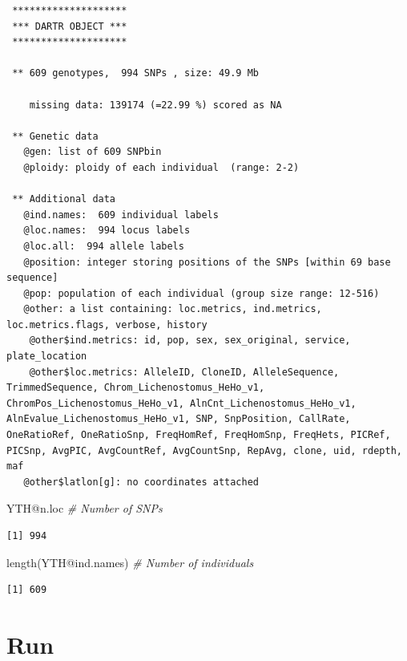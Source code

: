 \documentclass[
  letterpaper,
  DIV=11,
  numbers=noendperiod]{scrreprt}
\newenvironment{Shaded}{\begin{snugshade}}{\end{snugshade}}
\newcommand{\CommentTok}[1]{\textcolor[rgb]{0.38,0.63,0.69}{\textit{#1}}}
\newcommand{\FunctionTok}[1]{\textcolor[rgb]{0.02,0.16,0.49}{#1}}
\newcommand{\NormalTok}[1]{\textcolor[rgb]{0.00,0.44,0.13}{#1}}
\newcommand{\SpecialCharTok}[1]{\textcolor[rgb]{0.25,0.44,0.63}{#1}}
\let\textttOrig\texttt
\renewcommand{\texttt}[1]{\textttOrig{\color{blue}{#1}}}
\begin{document}
\begin{verbatim}
 ********************
 *** DARTR OBJECT ***
 ********************

 ** 609 genotypes,  994 SNPs , size: 49.9 Mb

    missing data: 139174 (=22.99 %) scored as NA

 ** Genetic data
   @gen: list of 609 SNPbin
   @ploidy: ploidy of each individual  (range: 2-2)

 ** Additional data
   @ind.names:  609 individual labels
   @loc.names:  994 locus labels
   @loc.all:  994 allele labels
   @position: integer storing positions of the SNPs [within 69 base sequence]
   @pop: population of each individual (group size range: 12-516)
   @other: a list containing: loc.metrics, ind.metrics, loc.metrics.flags, verbose, history 
    @other$ind.metrics: id, pop, sex, sex_original, service, plate_location 
    @other$loc.metrics: AlleleID, CloneID, AlleleSequence, TrimmedSequence, Chrom_Lichenostomus_HeHo_v1, ChromPos_Lichenostomus_HeHo_v1, AlnCnt_Lichenostomus_HeHo_v1, AlnEvalue_Lichenostomus_HeHo_v1, SNP, SnpPosition, CallRate, OneRatioRef, OneRatioSnp, FreqHomRef, FreqHomSnp, FreqHets, PICRef, PICSnp, AvgPIC, AvgCountRef, AvgCountSnp, RepAvg, clone, uid, rdepth, maf 
   @other$latlon[g]: no coordinates attached
\end{verbatim}

\begin{Shaded}
\begin{Highlighting}[]
\NormalTok{YTH}\SpecialCharTok{@}\NormalTok{n.loc  }\CommentTok{\# Number of SNPs}
\end{Highlighting}
\end{Shaded}

\begin{verbatim}
[1] 994
\end{verbatim}

\begin{Shaded}
\begin{Highlighting}[]
\FunctionTok{length}\NormalTok{(YTH}\SpecialCharTok{@}\NormalTok{ind.names)  }\CommentTok{\# Number of individuals}
\end{Highlighting}
\end{Shaded}

\begin{verbatim}
[1] 609
\end{verbatim}

\hypertarget{run-filter.sex.linked}{%
\section*{\texorpdfstring{Run
\texttt{filter.sex.linked}}{Run filter.sex.linked}}\label{run-filter.sex.linked}}
\addcontentsline{toc}{section}{Run \texttt{filter.sex.linked}}
\end{document}
